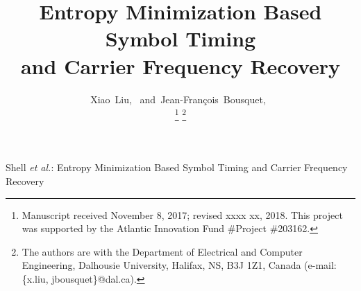 \documentclass[journal,comsoc]{IEEEtran}
\begin{document}
%

\title{Entropy Minimization Based Symbol Timing
\\and Carrier Frequency Recovery}
\author{Xiao~Liu,~
        and~Jean-Fran\c{c}ois~Bousquet,~%

\thanks{Manuscript received November 8, 2017; revised xxxx xx, 2018. This project was supported by the Atlantic Innovation Fund \#Project \#203162.}
\thanks{The authors are with the Department of Electrical and Computer Engineering, Dalhousie University, Halifax,
NS, B3J 1Z1, Canada (e-mail: \{x.liu, jbousquet\}@dal.ca).}%
}

%
{Shell \MakeLowercase{\textit{et al.}}: Entropy Minimization Based Symbol Timing and Carrier Frequency Recovery}

\maketitle
\end{document}
